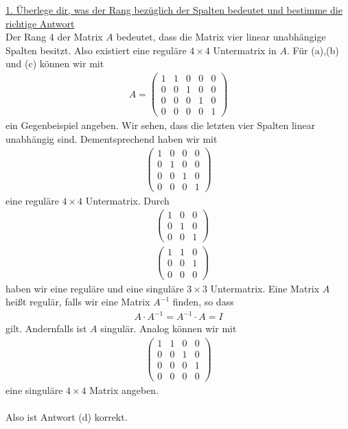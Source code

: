 \underline{1. Überlege dir, was der Rang bezüglich der Spalten bedeutet und bestimme die richtige Antwort}\\
Der Rang $4$ der Matrix $A$ bedeutet, dass die Matrix vier linear unabhängige Spalten besitzt.
Also existiert eine reguläre $4 \times 4$ Untermatrix in $A$.
Für (a),(b) und (c) können wir mit
\begin{align*}
A
= 
\begin{pmatrix}
1 & 1 & 0 & 0 & 0\\
0 & 0 & 1 & 0 &0 \\
0 & 0 & 0 & 1 & 0\\
0 & 0 & 0 & 0 & 1
\end{pmatrix}
\end{align*}
ein Gegenbeispiel angeben.
Wir sehen, dass die letzten vier Spalten linear unabhängig sind. 
Dementsprechend haben wir mit
\begin{align*}
\begin{pmatrix}
 1 & 0 & 0 & 0\\
 0 & 1 & 0 &0 \\
 0 & 0 & 1 & 0\\
 0 & 0 & 0 & 1
\end{pmatrix}
\end{align*}
eine reguläre $4 \times 4 $ Untermatrix.
Durch 
\begin{align*}
&\begin{pmatrix}
1 & 0 & 0 \\
0 & 1 & 0 \\
0 & 0 & 1
\end{pmatrix}\\
&\begin{pmatrix}
1 & 1 & 0 \\
0 & 0 & 1 \\
0 & 0 & 0
\end{pmatrix}
\end{align*}
haben wir eine reguläre und eine singuläre $3 \times 3 $ Untermatrix.
Eine Matrix $A$ heißt regulär, falls wir eine Matrix $A^{-1}$ finden, so dass 
\begin{align*}
A \cdot A^{-1} = A^{-1} \cdot A = I
\end{align*}
gilt.
Andernfalls ist $A$ singulär.
Analog können wir mit
\begin{align*}
\begin{pmatrix}
1 & 1 & 0 & 0\\
0 & 0 & 1 & 0  \\
0 & 0 & 0 & 1 \\
0 & 0 & 0 & 0 
\end{pmatrix}
\end{align*}
eine singuläre $4 \times 4 $ Matrix angeben.\\
\\
Also ist Antwort (d) korrekt.

